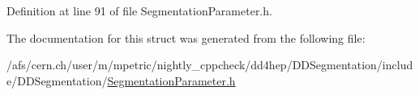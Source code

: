 Definition at line 91 of file SegmentationParameter.h.

The documentation for this struct was generated from the following file:\begin{DoxyCompactItemize}
\item 
/afs/cern.ch/user/m/mpetric/nightly\_\-cppcheck/dd4hep/DDSegmentation/include/DDSegmentation/\hyperlink{_segmentation_parameter_8h}{SegmentationParameter.h}\end{DoxyCompactItemize}
